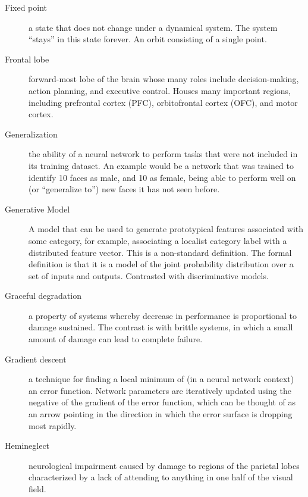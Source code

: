 \begin{description}
\item[Fixed point] a state that does not change under a dynamical system. The system ``stays'' in this state forever. An orbit consisting of a single point.

\item[Frontal lobe] forward-most lobe of the brain whose many roles include decision-making, action planning, and executive control. Houses many important regions, including prefrontal cortex (PFC), orbitofrontal cortex (OFC), and motor cortex. 


\item[Generalization] the ability of a neural network to perform tasks that were not included in its training dataset. An example would be a network that was trained to identify 10 faces as male, and 10 as female, being able to perform well on (or ``generalize to'') new faces it has not seen before.

\item[Generative Model] A model that can be used to generate prototypical features associated with some category, for example, associating a localist category label with a distributed feature vector. This is a non-standard definition. The formal definition is that it is a model of the joint probability distribution over a set of inputs and outputs. Contrasted with discriminative models. 

\item[Graceful degradation] a property of systems whereby decrease in performance is proportional to damage sustained. The contrast is with brittle systems, in which a small amount of damage can lead to complete failure.

\item[Gradient descent] a technique for finding a local minimum of (in a neural network context) an error function. Network parameters are iteratively updated using the negative of the gradient of the error function, which can be thought of as an arrow pointing in the direction in which the error surface is dropping most rapidly.


\item[Hemineglect] neurological impairment caused by damage to regions of the parietal lobes characterized by a lack of attending to anything in one half of the visual field.


\end{description}
